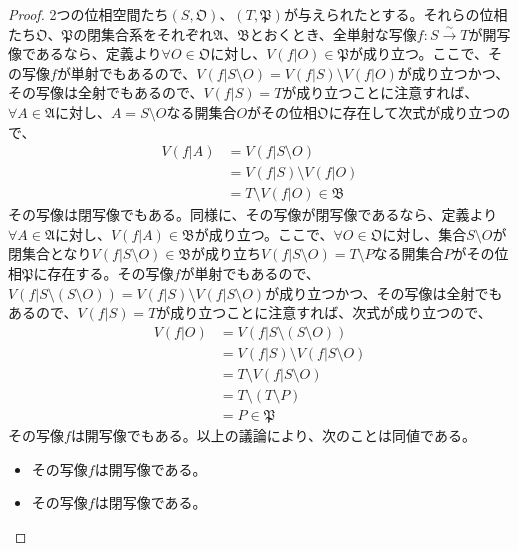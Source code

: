 \documentclass[dvipdfmx]{jsarticle}
\begin{document}
\begin{proof}
2つの位相空間たち$\left( S,\mathfrak{O} \right)$、$\left( T,\mathfrak{P} \right)$が与えられたとする。それらの位相たち$\mathfrak{O}$、$\mathfrak{P}$の閉集合系をそれぞれ$\mathfrak{A}$、$\mathfrak{B}$とおくとき、全単射な写像$f:S\overset{\sim}{\rightarrow}T$が開写像であるなら、定義より$\forall O \in \mathfrak{O}$に対し、$V\left( f|O \right) \in \mathfrak{P}$が成り立つ。ここで、その写像$f$が単射でもあるので、$V\left( f|S \setminus O \right) = V\left( f|S \right) \setminus V\left( f|O \right)$が成り立つかつ、その写像は全射でもあるので、$V\left( f|S \right) = T$が成り立つことに注意すれば、$\forall A \in \mathfrak{A}$に対し、$A = S \setminus O$なる開集合$O$がその位相$\mathfrak{O}$に存在して次式が成り立つので、
\begin{align*}
V\left( f|A \right) &= V\left( f|S \setminus O \right)\\
&= V\left( f|S \right) \setminus V\left( f|O \right)\\
&= T \setminus V\left( f|O \right) \in \mathfrak{B}
\end{align*}
その写像は閉写像でもある。同様に、その写像が閉写像であるなら、定義より$\forall A \in \mathfrak{A}$に対し、$V\left( f|A \right) \in \mathfrak{B}$が成り立つ。ここで、$\forall O \in \mathfrak{O}$に対し、集合$S \setminus O$が閉集合となり$V\left( f|S \setminus O \right) \in \mathfrak{B}$が成り立ち$V\left( f|S \setminus O \right) = T \setminus P$なる開集合$P$がその位相$\mathfrak{P}$に存在する。その写像$f$が単射でもあるので、$V\left( f|S \setminus (S \setminus O) \right) = V\left( f|S \right) \setminus V\left( f|S \setminus O \right)$が成り立つかつ、その写像は全射でもあるので、$V\left( f|S \right) = T$が成り立つことに注意すれば、次式が成り立つので、
\begin{align*}
V\left( f|O \right) &= V\left( f|S \setminus (S \setminus O) \right)\\
&= V\left( f|S \right) \setminus V\left( f|S \setminus O \right)\\
&= T \setminus V\left( f|S \setminus O \right)\\
&= T \setminus (T \setminus P)\\
&= P \in \mathfrak{P}
\end{align*}
その写像$f$は開写像でもある。以上の議論により、次のことは同値である。
\begin{itemize}
\item
  その写像$f$は開写像である。
\item
  その写像$f$は閉写像である。
\end{itemize}\par

\end{proof}
\end{document}
